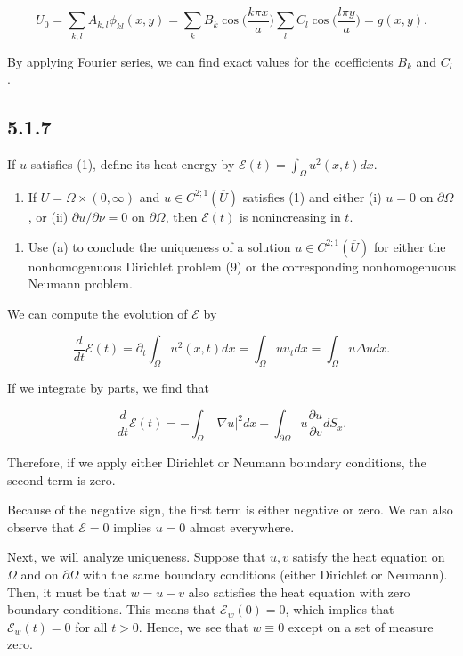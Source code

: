 \documentclass{article}
\begin{document}
$$U_0=\sum_{k,l}A_{k,l}\phi_{kl}(x,y)=\sum_{k}B_{k}\cos\Big(\frac{k\pi x}{a}\Big)\sum_{l}C_{l}\cos\Big(\frac{l\pi y}{a}\Big)=g(x,y).$$

By applying Fourier series, we can find exact values for the coefficients $B_k$ and $C_l$.

\subsection{\textbf{5.1.7}} If $u$ satisfies (1), define its heat energy by $\mathcal{E}(t)=\int_{\Omega}u^2(x,t)dx$.
\begin{enumerate}[label=(\alph*)]
    \item If $U=\Omega\times(0,\infty)$ and $u\in C^{2;1}(\overline{U})$ satisfies (1) and either (i) $u=0$ on $\partial\Omega$, or (ii) $\partial u /\partial \nu=0$ on $\partial\Omega$, then $\mathcal{E}(t)$ is nonincreasing in $t$.
\end{enumerate}
\begin{enumerate}[label=(\alph*),start=2]
    \item Use (a) to conclude the uniqueness of a solution $u\in C^{2;1}(\overline{U})$ for either the nonhomogenuous Dirichlet problem (9) or the corresponding nonhomogenuous Neumann problem.
\end{enumerate}

We can compute the evolution of $\mathcal{E}$ by

$$\frac{d}{dt}\mathcal{E}(t)=\partial_t\int_{\Omega}u^2(x,t)dx=\int_{\Omega}uu_tdx=\int_{\Omega}u\Delta udx.$$

If we integrate by parts, we find that

$$\frac{d}{dt}\mathcal{E}(t)=-\int_{\Omega}|\nabla u|^2dx+\int_{\partial\Omega}u\frac{\partial u}{\partial v}dS_x.$$

Therefore, if we apply either Dirichlet or Neumann boundary conditions, the second term is zero.

Because of the negative sign, the first term is either negative or zero. We can also observe that $\mathcal{E}=0$ implies $u = 0$ almost everywhere.

Next, we will analyze uniqueness. Suppose that $u,v$ satisfy the heat equation on $\Omega$ and on $\partial\Omega$ with the same boundary conditions (either Dirichlet or Neumann). Then, it must be that $w=u-v$ also satisfies the heat equation with zero boundary conditions. This means that $\mathcal{E}_w(0)=0$, which implies that $\mathcal{E}_w(t)=0$ for all $t>0$. Hence, we see that $w\equiv 0$ except on a set of measure zero. 
\end{document}
